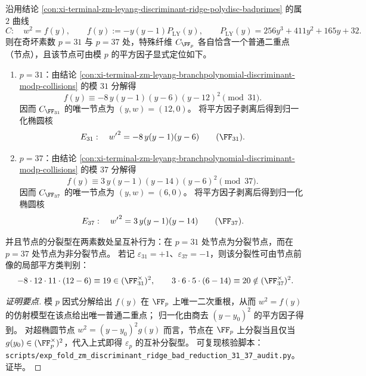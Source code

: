 \begin{conclusion}\label{con:xi-terminal-zm-leyang-discriminant-ridge-bad-reduction-nodal-normalization-31-37}
沿用结论 \ref{con:xi-terminal-zm-leyang-discriminant-ridge-polydisc-badprimes} 的属 \(2\) 曲线
\[
C:\quad w^{2}=f(y),\qquad f(y):=-y(y-1)P_{\mathrm{LY}}(y),\qquad P_{\mathrm{LY}}(y)=256y^{3}+411y^{2}+165y+32.
\]
则在奇坏素数 \(p=31\) 与 \(p=37\) 处，特殊纤维 \(C_{\FF_p}\) 各自恰含一个普通二重点（节点），且该节点可由模 \(p\) 的平方因子显式定位如下。
\begin{enumerate}
  \item \(p=31\)：由结论 \ref{con:xi-terminal-zm-leyang-branchpolynomial-discriminant-modp-collisions} 的模 \(31\) 分解得
  \[
  f(y)\equiv -8\,y(y-1)(y-6)(y-12)^{2}\pmod{31}.
  \]
  因而 \(C_{\FF_{31}}\) 的唯一节点为 \((y,w)=(12,0)\)。
  将平方因子剥离后得到归一化椭圆核
  \[
  E_{31}:\quad {w'}^{2}=-8\,y(y-1)(y-6)\qquad(\FF_{31}).
  \]
  \item \(p=37\)：由结论 \ref{con:xi-terminal-zm-leyang-branchpolynomial-discriminant-modp-collisions} 的模 \(37\) 分解得
  \[
  f(y)\equiv 3\,y(y-1)(y-14)(y-6)^{2}\pmod{37}.
  \]
  因而 \(C_{\FF_{37}}\) 的唯一节点为 \((y,w)=(6,0)\)。
  将平方因子剥离后得到归一化椭圆核
  \[
  E_{37}:\quad {w'}^{2}=3\,y(y-1)(y-14)\qquad(\FF_{37}).
  \]
\end{enumerate}
并且节点的分裂型在两素数处呈互补行为：在 \(p=31\) 处节点为分裂节点，而在 \(p=37\) 处节点为非分裂节点。
若记 \(\varepsilon_{31}=+1\)、\(\varepsilon_{37}=-1\)，则该分裂性可由节点前像的局部平方类判别：
\[
-8\cdot 12\cdot 11\cdot(12-6)\equiv 19\in(\FF_{31}^{\times})^{2},\qquad
3\cdot 6\cdot 5\cdot(6-14)\equiv 20\notin(\FF_{37}^{\times})^{2}.
\]
\end{conclusion}
\begin{proof}[证明要点]
模 \(p\) 因式分解给出 \(f(y)\) 在 \(\FF_p\) 上唯一二次重根，从而 \(w^{2}=f(y)\) 的仿射模型在该点给出唯一普通二重点；
归一化由商去 \((y-y_0)^2\) 的平方因子得到。
对超椭圆节点 \(w^{2}=(y-y_0)^2g(y)\) 而言，节点在 \(\FF_p\) 上分裂当且仅当 \(g(y_0)\in(\FF_p^\times)^2\)，代入上式即得 \(\varepsilon_p\) 的互补分裂型。
可复现核验脚本：\texttt{scripts/exp\_fold\_zm\_discriminant\_ridge\_bad\_reduction\_31\_37\_audit.py}。证毕。
\end{proof}

